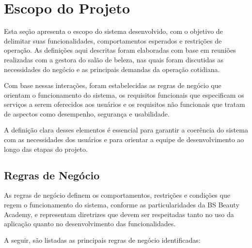 \section{Escopo do Projeto}


Esta seção apresenta o escopo do sistema desenvolvido, com o objetivo de delimitar suas funcionalidades, comportamentos esperados e restrições de operação. As definições aqui descritas foram elaboradas com base em reuniões realizadas com a gestora do salão de beleza, nas quais foram discutidas as necessidades do negócio e as principais demandas da operação cotidiana.

Com base nessas interações, foram estabelecidas as regras de negócio que orientam o funcionamento do sistema, os requisitos funcionais que especificam os serviços a serem oferecidos aos usuários e os requisitos não funcionais que tratam de aspectos como desempenho, segurança e usabilidade.

A definição clara desses elementos é essencial para garantir a coerência do sistema com as necessidades dos usuários e para orientar a equipe de desenvolvimento ao longo das etapas do projeto.

\subsection{Regras de Negócio}

As regras de negócio definem os comportamentos, restrições e condições que regem o funcionamento do sistema, conforme as particularidades da BS Beauty Academy, e representam diretrizes que devem ser respeitadas tanto no uso da aplicação quanto no desenvolvimento das funcionalidades.

A seguir, são listadas as principais regras de negócio identificadas:

